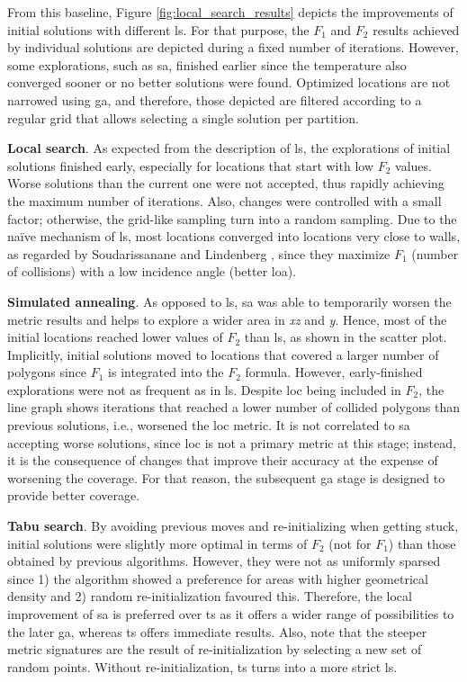 From this baseline, Figure \ref{fig:local_search_results} depicts the improvements of initial solutions with different \acrshort{ls}. For that purpose, the $F_1$ and $F_2$ results achieved by individual solutions are depicted during a fixed number of iterations. However, some explorations, such as \acrshort{sa}, finished earlier since the temperature also converged sooner or no better solutions were found. Optimized locations are not narrowed using \acrshort{ga}, and therefore, those depicted are filtered according to a regular grid that allows selecting a single solution per partition.

\textbf{Local search}. As expected from the description of \acrshort{ls}, the explorations of initial solutions finished early, especially for locations that start with low $F_2$ values. Worse solutions than the current one were not accepted, thus rapidly achieving the maximum number of iterations. Also, changes were controlled with a small factor; otherwise, the grid-like sampling turn into a random sampling. Due to the naïve mechanism of \acrshort{ls}, most locations converged into locations very close to walls, as regarded by Soudarissanane and Lindenberg \cite{soudarissanane_optimizing_2012}, since they maximize $F_1$ (number of collisions) with a low incidence angle (better \acrshort{loa}).

\textbf{Simulated annealing}. As opposed to \acrshort{ls}, \acrshort{sa} was able to temporarily worsen the metric results and helps to explore a wider area in \textit{xz} and \textit{y}. Hence, most of the initial locations reached lower values of $F_2$ than \acrshort{ls}, as shown in the scatter plot. Implicitly, initial solutions moved to locations that covered a larger number of polygons since $F_1$ is integrated into the $F_2$ formula. However, early-finished explorations were not as frequent as in \acrshort{ls}. Despite \acrshort{loc} being included in $F_2$, the line graph shows iterations that reached a lower number of collided polygons than previous solutions, i.e., worsened the \acrshort{loc} metric. It is not correlated to \acrshort{sa} accepting worse solutions, since \acrshort{loc} is not a primary metric at this stage; instead, it is the consequence of changes that improve their accuracy at the expense of worsening the coverage. For that reason, the subsequent \acrshort{ga} stage is designed to provide better coverage.

\textbf{Tabu search}. By avoiding previous moves and re-initializing when getting stuck, initial solutions were slightly more optimal in terms of $F_2$ (not for $F_1$) than those obtained by previous algorithms. However, they were not as uniformly sparsed since 1) the algorithm showed a preference for areas with higher geometrical density and 2) random re-initialization favoured this. Therefore, the local improvement of \acrshort{sa} is preferred over \acrshort{ts} as it offers a wider range of possibilities to the later \acrshort{ga}, whereas \acrshort{ts} offers immediate results. Also, note that the steeper metric signatures are the result of re-initialization by selecting a new set of random points. Without re-initialization, \acrshort{ts} turns into a more strict \acrshort{ls}.

